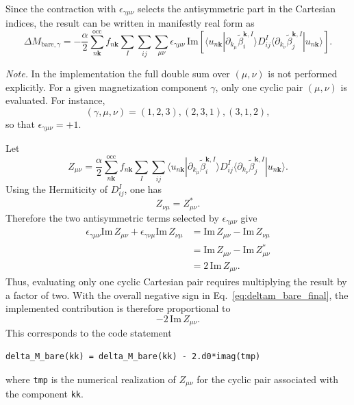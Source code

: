\documentclass[11pt]{article}
\begin{document}
Since the contraction with $\epsilon_{\gamma\mu\nu}$ selects the
antisymmetric part in the Cartesian indices, the result can be written
in manifestly real form as
\begin{equation}
\Delta M_{\mathrm{bare},\gamma}
=
-\frac{\alpha}{2}
\sum_{n\mathbf{k}}^{\mathrm{occ}} f_{n\mathbf{k}}
\sum_I \sum_{ij} \sum_{\mu\nu}
\epsilon_{\gamma\mu\nu}
\,\mathrm{Im}
\left[
\langle u_{n\mathbf{k}} | \partial_{k_\mu}
\widetilde{\beta}_i^{\mathbf{k},I} \rangle
D_{ij}^I
\langle \partial_{k_\nu}
\widetilde{\beta}_j^{\mathbf{k},I} | u_{n\mathbf{k}} \rangle
\right] .
\label{eq:deltam_bare_final}
\end{equation}

\noindent\textit{Note.}
In the implementation the full double sum over $(\mu,\nu)$ is not
performed explicitly. For a given magnetization component $\gamma$, only
one cyclic pair $(\mu,\nu)$ is evaluated. For instance,
\[
(\gamma,\mu,\nu)=(1,2,3),(2,3,1),(3,1,2),
\]
so that $\epsilon_{\gamma\mu\nu}=+1$.

Let
\begin{equation}
Z_{\mu\nu}
=
\frac{\alpha}{2}
\sum_{n\mathbf{k}}^{\mathrm{occ}} f_{n\mathbf{k}}
\sum_I \sum_{ij}
\langle u_{n\mathbf{k}} | \partial_{k_\mu}
\widetilde{\beta}_i^{\mathbf{k},I} \rangle
D_{ij}^I
\langle \partial_{k_\nu}
\widetilde{\beta}_j^{\mathbf{k},I} | u_{n\mathbf{k}} \rangle .
\end{equation}
Using the Hermiticity of $D_{ij}^I$, one has
\begin{equation}
Z_{\nu\mu}=Z_{\mu\nu}^{*}.
\end{equation}
Therefore the two antisymmetric terms selected by
$\epsilon_{\gamma\mu\nu}$ give
\begin{align}
\epsilon_{\gamma\mu\nu}\mathrm{Im}\,Z_{\mu\nu}
+
\epsilon_{\gamma\nu\mu}\mathrm{Im}\,Z_{\nu\mu}
&=
\mathrm{Im}\,Z_{\mu\nu}
-
\mathrm{Im}\,Z_{\nu\mu}
\nonumber\\
&=
\mathrm{Im}\,Z_{\mu\nu}
-
\mathrm{Im}\,Z_{\mu\nu}^{*}
\nonumber\\
&=
2\,\mathrm{Im}\,Z_{\mu\nu}.
\end{align}
Thus, evaluating only one cyclic Cartesian pair requires multiplying the
result by a factor of two. With the overall negative sign in
Eq.~\eqref{eq:deltam_bare_final}, the implemented contribution is
therefore proportional to
\begin{equation}
-2\,\mathrm{Im}\,Z_{\mu\nu}.
\end{equation}
This corresponds to the code statement
\begin{verbatim}
delta_M_bare(kk) = delta_M_bare(kk) - 2.d0*imag(tmp)
\end{verbatim}
where \texttt{tmp} is the numerical realization of $Z_{\mu\nu}$ for the
cyclic pair associated with the component \texttt{kk}.
\end{document}

